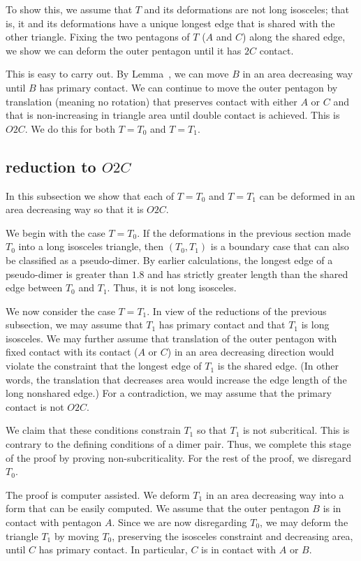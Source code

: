 To show this, we assume that $T$ and its deformations are not long isosceles;  that is,
it and its deformations have a unique longest edge that is shared with the other triangle.  Fixing the two pentagons of $T$
($A$ and $C$) along the shared edge, we show we can deform the outer pentagon until it has $2C$ contact.

This is easy to carry out.  By Lemma~, we can move $B$ in an area decreasing way until $B$ has primary
contact.  We can continue to move the outer pentagon by translation (meaning no rotation) that preserves contact with either
$A$ or $C$ and that is non-increasing in triangle area until double contact is achieved.  This is $O2C$.
We do this for both $T=T_0$ and $T=T_1$.

\subsection{reduction to $O2C$}

In this subsection we show that each of $T=T_0$ and $T=T_1$ can be deformed in an area decreasing way
so that
it is $O2C$.  

We begin with the case $T=T_0$.  If the deformations in the previous section made $T_0$ into a long isosceles triangle,
then $(T_0,T_1)$ is a boundary case that  can also be classified as a pseudo-dimer.  By earlier calculations, the longest edge
of a pseudo-dimer is greater than $1.8$ and has strictly greater length than the shared edge between $T_0$ and $T_1$.
Thus, it is not long isosceles.

We now consider the case $T=T_1$.
In view of the reductions of the previous subsection, we may assume that $T_1$ has primary contact and
that $T_1$ is long isosceles.  We may further assume  that translation of the outer pentagon with fixed contact with its contact ($A$ or $C$)
in an area decreasing direction would violate the constraint that the longest edge of $T_1$ is the shared edge.  (In other words,
the translation that decreases area would increase the edge length of the long nonshared edge.)
For a contradiction, we may assume that the primary contact is not $O2C$.

We claim that these conditions constrain $T_1$ so that $T_1$ is not subcritical.  This is contrary to the defining
conditions of a dimer pair.  Thus, we complete this stage of the proof by proving non-subcriticality. For the rest of the proof, we disregard $T_0$.

The proof is computer assisted.  We deform $T_1$ in an area decreasing way into
a form that can be easily computed.  We assume that the outer pentagon $B$ is in contact with pentagon $A$.
Since we are now disregarding $T_0$, we may deform the triangle $T_1$ by moving $T_0$, preserving the isosceles constraint and decreasing area,
until $C$ has primary contact.  In particular, $C$ is in contact with $A$ or $B$.

